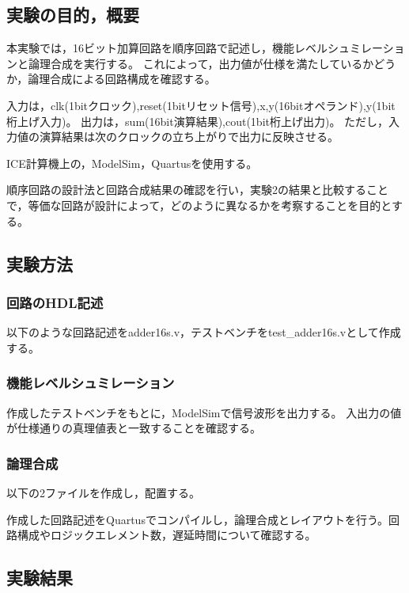 
\subsection{実験の目的，概要}
本実験では，16ビット加算回路を順序回路で記述し，機能レベルシュミレーションと論理合成を実行する。
これによって，出力値が仕様を満たしているかどうか，論理合成による回路構成を確認する。

入力は，clk(1bitクロック),reset(1bitリセット信号),x,y(16bitオペランド),y(1bit桁上げ入力)。
出力は，sum(16bit演算結果),cout(1bit桁上げ出力)。
ただし，入力値の演算結果は次のクロックの立ち上がりで出力に反映させる。

ICE計算機上の，ModelSim，Quartusを使用する。

順序回路の設計法と回路合成結果の確認を行い，実験2の結果と比較することで，等価な回路が設計によって，どのように異なるかを考察することを目的とする。

\subsection{実験方法}
\subsubsection{回路のHDL記述}
以下のような回路記述をadder16s.v，テストベンチをtest\_adder16s.vとして作成する。



\subsubsection{機能レベルシュミレーション}
作成したテストベンチをもとに，ModelSimで信号波形を出力する。
入出力の値が仕様通りの真理値表と一致することを確認する。

\subsubsection{論理合成}
以下の2ファイルを作成し，配置する。



作成した回路記述をQuartusでコンパイルし，論理合成とレイアウトを行う。回路構成やロジックエレメント数，遅延時間について確認する。
 
\subsection{実験結果}
